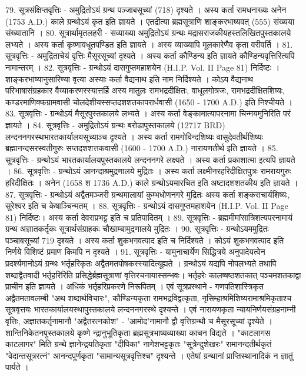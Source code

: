79. सूत्रसंक्षिप्तवृत्तिः - 
अमुद्रितोऽयं ग्रन्थ पञ्जाबसूच्यां (718) दृश्यते । अस्य कर्ता रामधनाख्यः अनेन (1753 A.D.) काले ग्रन्थोऽयं कृत इति ज्ञायते । एतद्रीत्या ब्रह्मसूत्राणि शाङ्करभाष्यवत् (555) संख्यया संख्यातानि । 
80. सूत्रार्थामृतलहरी - सव्याख्या 
अमुद्रितोऽयं ग्रन्थः मद्रासराजकीयहस्तलिखितपुस्तकालये लभ्यते । अस्य कर्ता कृष्णावधूतपण्डित इति ज्ञायते । अस्य व्याख्यापि मूलकारेणैव कृता वरीवर्ति । 
81. सूत्रवृत्तिः - अमुद्रिताचेयं वृत्तिः मैसूरसूच्यां दृश्यते । अस्य कर्ता कौण्डिन्य इति ज्ञायते कौण्डिन्यवृत्तिरित्यपि नामान्तरम् ।
82. सूत्रवृत्तिः -
ग्रन्थोऽयं दासगुप्तमहाशयेन (H.I.P. Vol. II Page 81) निर्दिष्टः । शाङ्करभाष्यानुसारिण्या वृत्या अस्याः कर्ता वैद्यनाथ इति नाम निर्दिश्यते । कोऽय वैद्यनाथ परिभाषासंग्रहकार वैय्याकरणस्स्यात्तर्हि अस्य मातुलः रामभद्रदीक्षितः, वाधूलगोत्रजः, रामभद्रदीक्षितशिष्यः, कण्डरमाणिक्कग्रामवासी चोलदेशीयस्सप्तदशशतकापरार्धवासी (1650 - 1700 A.D.) इति निश्चीयते ।  
83. सूत्रवृत्तिः - ग्रन्थोऽयं मैसूरपुस्तकालये लभ्यते । अस्य कर्ता वेङ्कामात्यापरनामा चिन्मयमुनिरिति परं ज्ञायते । 
84. सूत्रवृत्तिः -  
अमुद्रितोऽयं ग्रन्थः बरोडापुस्तकालये (12717 BRD) लन्दननगरस्थभारतकार्यालयसूच्याञ्च दृश्यते । अस्य कर्ता रामगोविन्दशिष्यः वासुदेवतीर्थशिष्यः ब्रह्मानन्दसरस्वतीगुरुः सप्तदशशत्तकवासी (1600 - 1700 A.D.) नारायणतीर्थ इति ज्ञायते । 
85. सूत्रवृत्तिः - ग्रन्थोऽयं भारतकार्यालयपुस्तकालये लन्दननगरे लक्ष्यते । अस्य कर्ता प्रकाशात्मा इत्यपि ज्ञायते ।
86. सूत्रवृत्तिः - 
ग्रन्थोऽयं आनन्दाश्रमुद्रणालये मुद्रितः । अस्य कर्ता लक्ष्मीनरहरिदीक्षितपुत्रः रामरायगुरुः हरिदीक्षितः । अनेन (1658 श 1736 A.D.) काले ग्रन्थोऽयमारचित इति अष्टादशशतकीय इति ज्ञायते । 
87. सूत्रवृत्तिः -
ग्रन्थोऽयं अद्वैतमञ्जरी ग्रन्थमालायां कुम्भधोणनगरे मुद्रितः अस्य कर्ता शङ्कराचार्यशिष्यः, सुरेश्वर इति च केषाञ्चिन्मतम् । 
88. सूत्रवृत्तिः -
ग्रन्थोऽयं दासगुप्तमहाशयेन (H.I.P. Vol. II Page 81) निर्दिष्टः। अस्य कर्ता देवराप्रभट्ट इति च प्रतिपादितम् । 
89. सूत्रवृत्तिः - 
ब्रह्ममीमांसात्रिशत्यपरनामायं ग्रन्थ अज्ञातकर्तृकः सूत्रार्थसंग्राहकः चौखाम्बामुद्रणालये मुद्रितः । 
90. सूत्रवृत्तिः -
ग्रन्थोऽयममुद्रितः पञ्चाबसूच्यां 719 दृश्यते । अस्य कर्ता शुकभगवत्पाद इति च निर्दिश्यते । कोऽयं शुकभगवत्पाद इति निर्णये विशिष्टं प्रमाण किमपि न दृश्यते । 
91. सूत्रवृत्तिः -
यामुनाचार्येण सिद्धित्रये अनुपादेयत्वेन प्रदर्श्यमानोऽयं ग्रन्थः भर्तृहरिकृतः अद्वैतमतपोषकस्स्यादित्यूह्यते । ग्रन्थोऽयं यद्यपि नोपलभ्यते तथापि शब्दाद्वैतवादी भर्तृहरिरिति प्रसिद्धेर्ब्रह्मसूत्राणां वृत्तिरचनायास्सम्भवः। भर्तृहरेः कालष्षष्ठशतकात् पञ्चमशतकाद्वा प्राचीन इति ज्ञायते । अधिकं भर्तृहरिप्रकरणे निरूपितम् । 
एवं सूत्रप्रस्थाने - गणपतिशास्त्रिकृत अद्वैतमतावलम्बी "अथ शब्दार्थविचारः", कौण्डिन्यकृता रामभद्रविद्वत्कृता, नृसिम्हाश्रमिशिष्यरामाश्रमिकृताश्च सूत्रवृत्तयः भारतकार्यालयस्थापुस्तकालये लन्दननगरस्थे दृश्यन्ते । एवं नारायणकृता न्यायनिर्णयसंग्रहनाम्नी वृत्तिः, अज्ञातकर्तृनामानौ "अद्वैतरत्नकोश" - 'आमोद'नामानौ द्वौ वृत्तिग्रन्थौ च मैसूरसूच्यां दृश्येते । शान्तिनिकेतनपुस्तकालये कृष्णे न्द्रानुभूतिकृता ब्रह्मसूत्रभाष्यव्याख्या काचन विद्यते । "काटलागस काटलागर" मिति ग्रन्थे ज्ञानेन्द्रयतिकृता "दीपिका" नागेशभट्टकृतः "सूत्रेन्दुशेखरः" रामानन्दतीर्थकृतं "वेदान्तसूत्ररत्नं" आनन्दपूर्णकृता "सामान्यसूत्रवृत्तिश्च" दृश्यन्ते । एतेषां ग्रन्थानां प्राप्तिस्थानादिकं न ज्ञातुं पार्यते ।  
